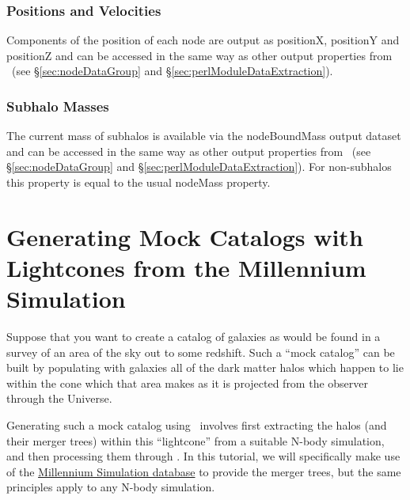 \subsubsection{Positions and Velocities}

Components of the position of each node are output as {\normalfont \ttfamily positionX}, {\normalfont \ttfamily positionY} and {\normalfont \ttfamily positionZ} and can be accessed in the same way as other output properties from \glc\ (see \S\ref{sec:nodeDataGroup} and \S\ref{sec:perlModuleDataExtraction}).

\subsubsection{Subhalo Masses}

The current mass of subhalos is available via the {\normalfont \ttfamily nodeBoundMass} output dataset and can be accessed in the same way as other output properties from \glc\ (see \S\ref{sec:nodeDataGroup} and \S\ref{sec:perlModuleDataExtraction}). For non-subhalos this property is equal to the usual {\normalfont \ttfamily nodeMass} property.

\section{Generating Mock Catalogs with Lightcones from the Millennium Simulation}

Suppose that you want to create a catalog of galaxies as would be found in a survey of an area of the sky out to some redshift. Such a ``mock catalog'' can be built by populating with galaxies all of the dark matter halos which happen to lie within the cone which that area makes as it is projected from the observer through the Universe.

Generating such a mock catalog using \glc\ involves first extracting the halos (and their merger trees) within this ``lightcone'' from a suitable N-body simulation, and then processing them through \glc. In this tutorial, we will specifically make use of the \href{http://gavo.mpa-garching.mpg.de/MyMillennium3/MyDB}{Millennium Simulation database} to provide the merger trees, but the same principles apply to any N-body simulation.

